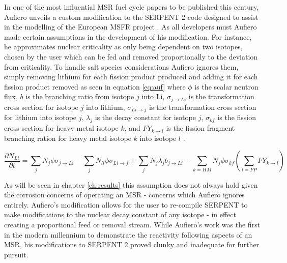 In one of the most influential MSR fuel cycle papers to be published this
century, Aufiero unveils a custom modification to the SERPENT 2 code designed to
assist in the modelling of the European MSFR project \cite{Aufiero}. As all
developers must Aufiero made certain assumptions in the development of his
modification. For instance, he
 approximates nuclear criticality as only being dependent 
on two isotopes, chosen by the user which can be fed and removed proportionally
to the deviation from criticality. To handle salt species considerations Aufiero
ignores them, simply removing lithium for each fission product produced and
adding it for each fission product removed as seen in equation \ref{eq:auf} 
where $\phi$ is the scalar neutron flux, $b$ is the branching ratio
from isotope $j$ into Li, $\sigma_{j \rightarrow Li}$ is the transformation
cross section for isotope $j$ into lithium, $\sigma_{Li \rightarrow j}$ is the
transformation cross section for lithium into isotope $j$, $\lambda_{j}$ is
the decay constant for isotope $j$, $\sigma_{kf}$ is the fission cross section
for heavy metal isotope $k$, and $FY_{k \rightarrow l}$ is the fission
fragment branching ration for heavy metal isotope $k$ into isotope $l$ \cite{Aufiero}. 

\begin{equation} \label{eq:auf}
\frac{\partial N_{Li}}{\partial t} = \sum_{j} N_{j} \phi \sigma_{j \rightarrow
    Li} - \sum_{j} N_{li} \phi \sigma_{Li \rightarrow j} + \sum_{j} N_{j}
    \lambda_{j} b_{j \rightarrow Li} - \sum_{k = HM} N_{j} \phi \sigma_{kf}
    \left ( \sum_{l=FP}FY_{k \rightarrow l} \right )
\end{equation}

As will be seen in chapter \ref{ch:results} this assumption does not always hold
given the corrosion concerns of operating an MSR - concerns which Aufiero ignores
entirely. Aufiero's modification allows for the user to re-compile SERPENT to
make modifications to the nuclear decay constant of any isotope - in effect 
creating a proportional feed or removal stream. While Aufiero's work was the
first in the modern millennium to demonstrate the reactivity following aspects
of an MSR, his modifications to SERPENT 2 proved clunky and inadequate for
further pursuit.

